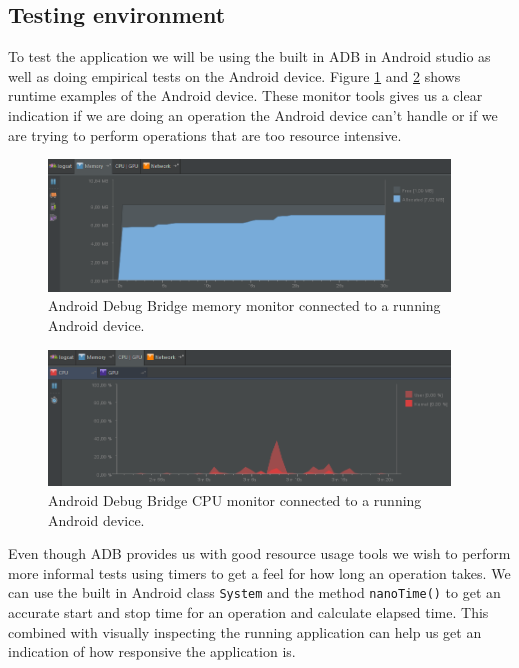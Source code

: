 \subsection{Testing environment}
To test the application we will be using the built in ADB in Android studio as well as doing empirical tests on the Android device. Figure \ref{fig:ADBMemory} and \ref{fig:ADBCPU} shows runtime examples of the Android device. These monitor tools gives us a clear indication if we are doing an operation the Android device can't handle or if we are trying to perform operations that are too resource intensive.

\begin{figure}[h!]
  \caption{Android Debug Bridge memory monitor connected to a running Android device.}
  \label{fig:ADBMemory}
  \centering
    \includegraphics[width=0.95\textwidth]{images/ADBMemory.png}
\end{figure}

\begin{figure}[h!]
  \caption{Android Debug Bridge CPU monitor connected to a running Android device.}
  \label{fig:ADBCPU}
  \centering
    \includegraphics[width=0.95\textwidth]{images/ADBCPU.png}
\end{figure}

Even though ADB provides us with good resource usage tools we wish to perform more informal tests using timers to get a feel for how long an operation takes. We can use the built in Android class \texttt{System} and the method \texttt{nanoTime()} to get an accurate start and stop time for an operation and calculate elapsed time. This combined with visually inspecting the running application can help us get an indication of how responsive the application is.
